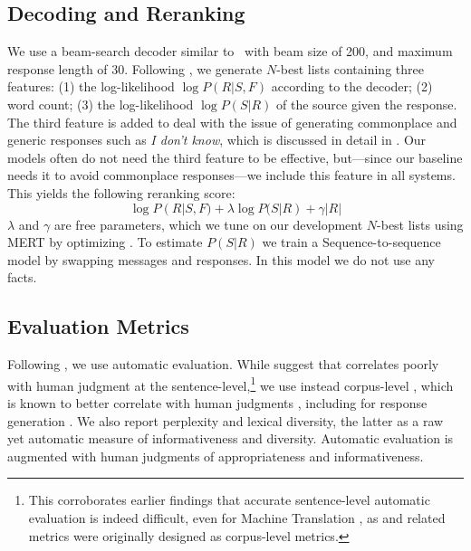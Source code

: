 \documentclass[letterpaper]{article}
\begin{document}
\subsection {Decoding and Reranking}

We use a beam-search decoder similar to~\cite{sutskever2014sequence} with beam size of 200, and maximum response length of 30.
Following \cite{li2016diversity}, we generate $N$-best lists containing three features: (1) the log-likelihood $\log P(R|S,F)$ according to the decoder; (2) word count; (3) the log-likelihood $\log P(S|R)$ of the source given the response.
The third feature is added to deal with the issue of generating commonplace and generic responses such as {\it I don't know},
which is discussed in detail in \cite{li2016diversity}.
Our models often do not need the third feature to be effective, but---since our baseline needs it to avoid commonplace responses---we include this feature in all systems.
This yields the following reranking score:
\begin{equation*}
\log P(R|S,F) + \lambda \log P(S|R) + \gamma |R|
\end{equation*}
$\lambda$ and $\gamma$ are free parameters, which we tune on
our development $N$-best lists
using MERT \cite{mert}
by optimizing \bleu. To estimate $P(S|R)$ we train a Sequence-to-sequence model  by swapping messages and responses. In this model we do not use any facts.

\subsection{Evaluation Metrics}

Following \cite{sordoni2015,li2016diversity,Wen2017Latent}, we use \bleu automatic evaluation. While \cite{notbleu:2016} suggest that \bleu correlates poorly with human judgment at the sentence-level,\footnote{This corroborates earlier findings that accurate sentence-level automatic evaluation is indeed difficult, even for Machine Translation \cite{graham-baldwin-mathur:2015:NAACL-HLT}, as \bleu and related metrics were originally designed as corpus-level metrics.} we use instead corpus-level \bleu, which is known to better correlate with human judgments \cite{MetricsMATR:2008}, including for response generation \cite{galley2015}. We also report perplexity and lexical diversity, the latter as a raw yet automatic measure of informativeness and diversity.
Automatic evaluation is augmented with human judgments of appropriateness and informativeness.
\end{document}
